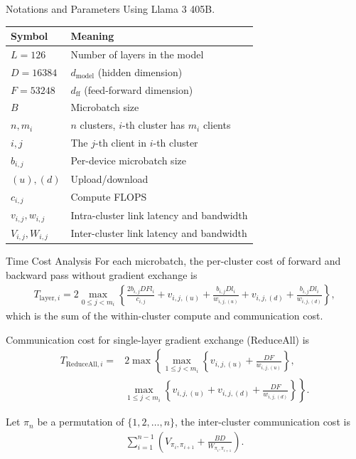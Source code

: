 \documentclass{beamer}
\begin{document}
\begin{frame}{Notations and Parameters}
    Using Llama 3 405B.

    \vspace{0.5em}
    \centering
    \small
    \begin{tabular}{l|l}
        \textbf{Symbol} & \textbf{Meaning} \\
        \hline
        $L = 126$ & Number of layers in the model \\
        \hline
        $D = 16384$ & $d_{\text{model}}$ (hidden dimension) \\
        \hline
        $F = 53248$ & $d_{\text{ff}}$ (feed-forward dimension) \\
        \hline
        $B$ & Microbatch size \\
        \hline
        $n, m_i$ & $n$ clusters, $i$-th cluster has $m_i$ clients \\
        \hline
        $i, j$ & The $j$-th client in $i$-th cluster \\
        \hline
        $b_{i, j}$ & Per-device microbatch size \\
        \hline
        $(u), (d)$ & Upload/download \\
        \hline
        $c_{i, j}$ & Compute FLOPS \\
        \hline
        $v_{i, j}, w_{i, j}$ & Intra-cluster link latency and bandwidth \\
        \hline
        $V_{i, j}, W_{i, j}$ & Inter-cluster link latency and bandwidth \\
    \end{tabular}
\end{frame}

\begin{frame}[allowframebreaks]{Time Cost Analysis}
    For each microbatch, the per-cluster cost of forward and backward pass without gradient exchange is
    \begin{align}
        T_{\text{layer}, i} = 2\max_{0 \le j < m_i}\left\{\frac{2b_{i, j}DFl_i}{c_{i, j}} + v_{i,j, (u)} + \frac{b_{i,j}Dl_i}{w_{i, j, (u)}} + v_{i,j, (d)} + \frac{b_{i, j}Dl_i}{w_{i, j, (d)}}\right\},
    \end{align}
    which is the sum of the within-cluster compute and communication cost.

    Communication cost for single-layer gradient exchange (ReduceAll) is
    \begin{align}
        T_{\text{ReduceAll}, i} =& 2\max\left\{\max_{1 \le j < m_i}\left\{v_{i,j, (u)} + \frac{DF}{w_{i, j, (u)}}\right\},\right. \nonumber \\
        &\left.\max_{1 \le j < m_i}\left\{v_{i,j, (u)} + v_{i,j, (d)} + \frac{DF}{w_{i, j, (d)}}\right\}\right\}.
    \end{align}

    \framebreak
        
    Let $\pi_n$ be a permutation of $\{1, 2, \dots, n\}$, the inter-cluster communication cost is
    \begin{align}
        \sum_{i=1}^{n-1} \left(V_{\pi_{i}, \pi_{i + 1}} + \frac{BD}{W_{\pi_{i}, \pi_{i + 1}}}\right).
    \end{align}
\end{frame}
\end{document}
